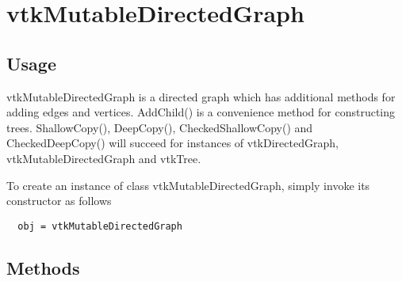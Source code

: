 \section{vtkMutableDirectedGraph}

\subsection{Usage}

 vtkMutableDirectedGraph is a directed graph which has additional methods
 for adding edges and vertices. AddChild() is a convenience method for
 constructing trees. ShallowCopy(), DeepCopy(), CheckedShallowCopy() and
 CheckedDeepCopy() will succeed for instances of vtkDirectedGraph,
 vtkMutableDirectedGraph and vtkTree.


To create an instance of class vtkMutableDirectedGraph, simply
invoke its constructor as follows
\begin{verbatim}
  obj = vtkMutableDirectedGraph
\end{verbatim}
\subsection{Methods}

